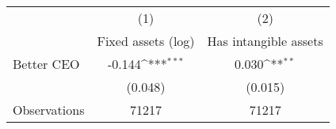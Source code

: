 {
\def\sym#1{\ifmmode^{#1}\else\(^{#1}\)\fi}
\begin{tabular}{l*{2}{c}}
\hline\hline
                    &\multicolumn{1}{c}{(1)}&\multicolumn{1}{c}{(2)}\\
                    &\multicolumn{1}{c}{Fixed assets (log)}&\multicolumn{1}{c}{Has intangible assets}\\
\hline
Better CEO          &      -0.144\sym{***}&       0.030\sym{**} \\
                    &     (0.048)         &     (0.015)         \\
\hline
Observations        &       71217         &       71217         \\
\hline\hline
\end{tabular}
}
